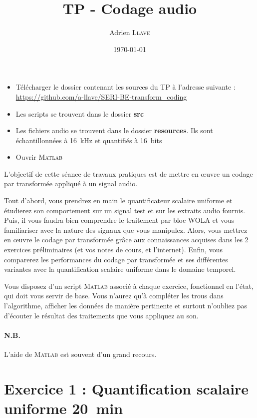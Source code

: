 \documentclass{article}
\title{\textbf{TP - Codage audio}}
\author{Adrien \textsc{Llave}}
\date{\today}
\begin{document}
\maketitle

\begin{itemize}
	\item Télécharger le dossier contenant les sources du TP à l'adresse suivante : \url{https://github.com/a-llave/SERI-BE-transform_coding}
	\item Les scripts se trouvent dans le dossier \textbf{src}
	\item Les fichiers audio se trouvent dans le dossier \textbf{resources}. Ils sont échantillonnées à 16~kHz et quantifiés à 16~bits
	\item Ouvrir \textsc{Matlab}
\end{itemize}


L'objectif de cette séance de travaux pratiques est de mettre en \oe uvre un codage par transformée appliqué à un signal audio.

Tout d'abord, vous prendrez en main le quantificateur scalaire uniforme et étudierez son comportement sur un signal test et sur les extraits audio fournis.
Puis, il vous faudra bien comprendre le traitement par bloc WOLA et vous familiariser avec la nature des signaux que vous manipulez.
Alors, vous mettrez en \oe uvre le codage par transformée grâce aux connaissances acquises dans les 2 exercices préliminaires (et vos notes de cours, et l'internet). Enfin, vous comparerez les performances du codage par transformée et ses différentes variantes avec la quantification scalaire uniforme dans le domaine temporel.

Vous disposez d'un script \textsc{Matlab} associé à chaque exercice, fonctionnel en l'état, qui doit vous servir de base. Vous n'aurez qu'à compléter les trous dans l'algorithme, afficher les données de manière pertinente et surtout n'oubliez pas d'écouter le résultat des traitements que vous appliquez au son.

\paragraph{N.B.} L'aide de \textsc{Matlab} est souvent d'un grand recours.

\section{Exercice 1 : Quantification scalaire uniforme \small{20~min}}
\end{document}
